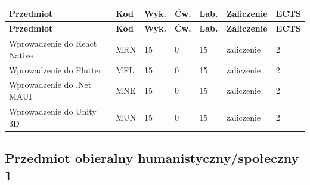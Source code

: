 \documentclass[12pt,a4paper]{article}
\newcommand{\thdrule}{\noalign{\global\setlength{\extrarowheight}{0pt}}}
\newcommand{\thdend}{\noalign{\global\setlength{\extrarowheight}{4pt}}}
\begin{document}
{\scriptsize
\begin{longtable}{m{5.5cm}m{0.8cm}m{1cm}m{1cm}m{1cm}m{1.7cm}m{0.7cm}}
\thdrule\toprule
\rowcolor{pjatkRed}
{\color{white}\footnotesize\textbf{\vphantom{Ag}Przedmiot}} & {\color{white}\footnotesize\textbf{\vphantom{Ag}Kod}} & {\color{white}\footnotesize\textbf{\vphantom{Ag}Wyk.}} & {\color{white}\footnotesize\textbf{\vphantom{Ag}Ćw.}} & {\color{white}\footnotesize\textbf{\vphantom{Ag}Lab.}} & {\color{white}\footnotesize\textbf{\vphantom{Ag}Zaliczenie}} & {\color{white}\footnotesize\textbf{\vphantom{Ag}ECTS}} \\
\midrule\thdend
\endfirsthead
\thdrule\toprule
\rowcolor{pjatkRed}
{\color{white}\footnotesize\textbf{\vphantom{Ag}Przedmiot}} & {\color{white}\footnotesize\textbf{\vphantom{Ag}Kod}} & {\color{white}\footnotesize\textbf{\vphantom{Ag}Wyk.}} & {\color{white}\footnotesize\textbf{\vphantom{Ag}Ćw.}} & {\color{white}\footnotesize\textbf{\vphantom{Ag}Lab.}} & {\color{white}\footnotesize\textbf{\vphantom{Ag}Zaliczenie}} & {\color{white}\footnotesize\textbf{\vphantom{Ag}ECTS}} \\
\midrule\thdend
\endhead
\rowcolor{tableRowLight} Wprowadzenie do React Native & MRN & 15 & 0 & 15 & {\scriptsize zaliczenie} & 2 \\
\rowcolor{tableRowAlt} Wprowadzenie do Flutter & MFL & 15 & 0 & 15 & {\scriptsize zaliczenie} & 2 \\
\rowcolor{tableRowLight} Wprowadzenie do .Net MAUI & MNE & 15 & 0 & 15 & {\scriptsize zaliczenie} & 2 \\
\rowcolor{tableRowAlt} Wprowadzenie do Unity 3D & MUN & 15 & 0 & 15 & {\scriptsize zaliczenie} & 2 \\
\bottomrule
\end{longtable}}

\subsection*{Przedmiot obieralny humanistyczny/społeczny 1}
\end{document}
